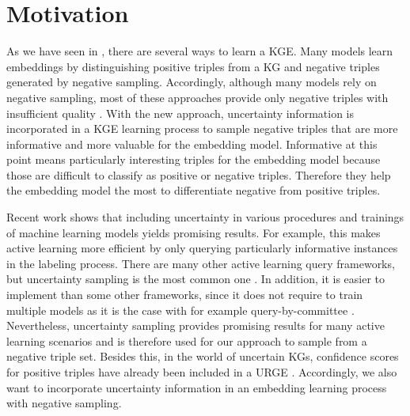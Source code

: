\section{Motivation} 
\label{sec:motivation}
As we have seen in , there are several ways to learn a \ac{KGE}.
Many models learn embeddings by distinguishing positive triples from a \ac{KG} and negative triples generated by negative sampling.
Accordingly, although many models rely on negative sampling, most of these approaches provide only negative triples with insufficient quality \cite{qiannegative}.
With the new approach, uncertainty information is incorporated in a \ac{KGE} learning process to sample negative triples that are more informative and more valuable for the embedding model.
Informative at this point means particularly interesting triples for the embedding model because those are difficult to classify as positive or negative triples.
Therefore they help the embedding model the most to differentiate negative from positive triples.

Recent work shows that including uncertainty in various procedures and trainings of machine learning models yields promising results.
For example, this makes active learning more efficient by only querying particularly informative instances in the labeling process.
There are many other active learning query frameworks, but uncertainty sampling is the most common one \cite{Settles2009ActiveLL}.
In addition, it is easier to implement than some other frameworks, since it does not require to train multiple models as it is the case with for example query-by-committee  \cite{Settles2009ActiveLL}.
Nevertheless, uncertainty sampling provides promising results for many active learning scenarios and is therefore used for our approach to sample from a negative triple set.
Besides this, in the world of uncertain \acp{KG}, confidence scores for positive triples have already been included in a \ac{URGE} \cite{UKGE}.
Accordingly, we also want to incorporate uncertainty information in an embedding learning process with negative sampling.

